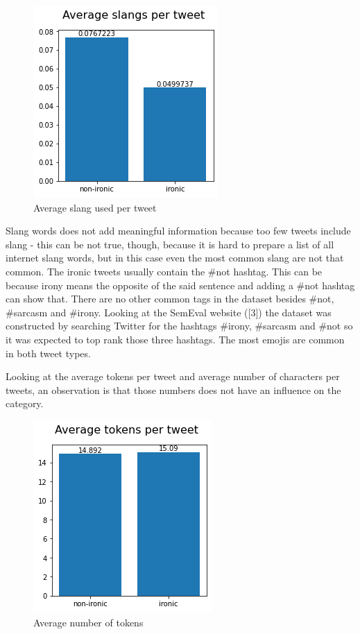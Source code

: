 \documentclass[11pt]{article}
\begin{document}
\begin{figure}[h!]
    \begin{center}
  \includegraphics[scale=0.5]{slang}
  \caption{Average slang used per tweet}\label{fig:figure13}
        \end{center}
\end{figure}


  Slang words does not add meaningful information because too few tweets include slang - this can be not true, though, because it is hard to prepare a list of all internet slang words, but in this case even the most common slang are not that common.
  The ironic tweets usually contain the \#not hashtag.
  This can be because irony means the opposite of the said sentence and adding a \#not hashtag can show that.
  There are no other common tags in the dataset besides \#not, \#sarcasm and \#irony.
Looking at the SemEval website ([3]) the dataset was constructed by searching Twitter for the hashtags \#irony, \#sarcasm and \#not so it was expected to top rank those three hashtags.
  The most emojis are common in both tweet types.

  Looking at the average tokens per tweet and average number of characters per tweets, an observation is that those numbers does not have an influence on the category.


\begin{figure}[h!]
\begin{center}
  \includegraphics[scale=0.5]{avg_tokens}

  \caption{Average number of tokens}\label{fig:figure12}
      \end{center}
\end{figure}
\end{document}
